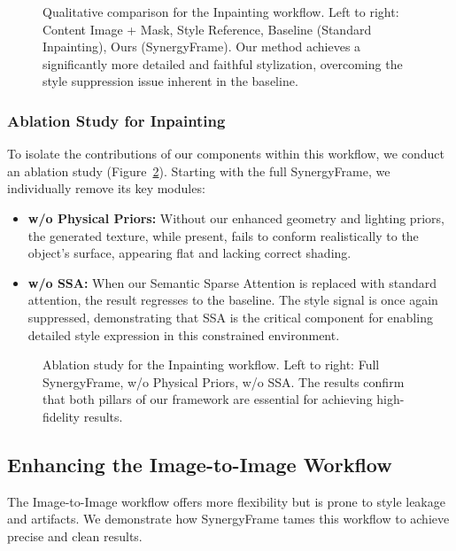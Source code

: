 \documentclass[letterpaper]{article} %
\begin{document}
\begin{figure}[h]
  \centering
  \caption{Qualitative comparison for the Inpainting workflow. Left to right: Content Image + Mask, Style Reference, Baseline (Standard Inpainting), Ours (SynergyFrame). Our method achieves a significantly more detailed and faithful stylization, overcoming the style suppression issue inherent in the baseline.}
  \label{fig:inpainting_comparison}
\end{figure}

\subsubsection{Ablation Study for Inpainting}
To isolate the contributions of our components within this workflow, we conduct an ablation study (Figure~\ref{fig:inpainting_ablation}). Starting with the full SynergyFrame, we individually remove its key modules:
\begin{itemize}
    \item \textbf{w/o Physical Priors:} Without our enhanced geometry and lighting priors, the generated texture, while present, fails to conform realistically to the object's surface, appearing flat and lacking correct shading.
    \item \textbf{w/o SSA:} When our Semantic Sparse Attention is replaced with standard attention, the result regresses to the baseline. The style signal is once again suppressed, demonstrating that SSA is the critical component for enabling detailed style expression in this constrained environment.
\end{itemize}

\begin{figure}[h]
  \centering
  \caption{Ablation study for the Inpainting workflow. Left to right: Full SynergyFrame, w/o Physical Priors, w/o SSA. The results confirm that both pillars of our framework are essential for achieving high-fidelity results.}
  \label{fig:inpainting_ablation}
\end{figure}

\subsection{Enhancing the Image-to-Image Workflow}
\label{sec:exp_img2img}

The Image-to-Image workflow offers more flexibility but is prone to style leakage and artifacts. We demonstrate how SynergyFrame tames this workflow to achieve precise and clean results.
\end{document}

